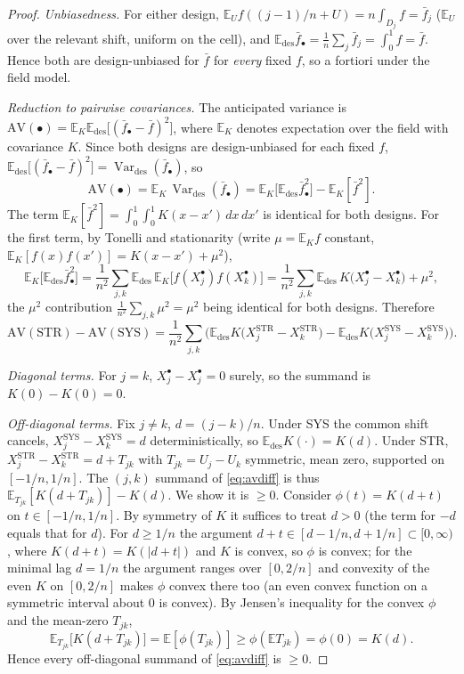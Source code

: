 \documentclass{amsart}
\theoremstyle{definition}
\newcommand{\E}{\mathbb{E}}
\newcommand{\Var}{\operatorname{Var}}
\begin{document}
\begin{proof}
\emph{Unbiasedness.} For either design, $\E_U f((j-1)/n+U)
=n\int_{D_j}f=\bar f_j$ ($\E_U$ over the relevant shift, uniform on the
cell), and $\E_{\mathrm{des}}\bar f_\bullet=\frac1n\sum_j\bar f_j
=\int_0^1 f=\bar f$. Hence both are design-unbiased for $\bar f$ for
\emph{every} fixed $f$, so a fortiori under the field model.

\emph{Reduction to pairwise covariances.} The anticipated variance is
$\mathrm{AV}(\bullet)=\E_K\E_{\mathrm{des}}\big[(\bar f_\bullet-\bar
f)^2\big]$, where $\E_K$ denotes expectation over the field with covariance
$K$. Since both designs are design-unbiased for each fixed $f$,
$\E_{\mathrm{des}}\big[(\bar f_\bullet-\bar f)^2\big]
=\Var_{\mathrm{des}}(\bar f_\bullet)$, so
\[
\mathrm{AV}(\bullet)
=\E_K\,\Var_{\mathrm{des}}(\bar f_\bullet)
=\E_K\Big[\E_{\mathrm{des}}\bar f_\bullet^2\Big]-\E_K[\bar f^2].
\]
The term $\E_K[\bar f^2]=\int_0^1\!\int_0^1 K(x-x')\,dx\,dx'$ is identical
for both designs. For the first term, by Tonelli and stationarity (write
$\mu=\E_K f$ constant, $\E_K[f(x)f(x')]=K(x-x')+\mu^2$),
\[
\E_K\big[\E_{\mathrm{des}}\bar f_\bullet^2\big]
=\frac1{n^2}\sum_{j,k}\E_{\mathrm{des}}\,
\E_K\big[f(X_j^\bullet)f(X_k^\bullet)\big]
=\frac1{n^2}\sum_{j,k}
\E_{\mathrm{des}}\,K\!\big(X_j^\bullet-X_k^\bullet\big)+\mu^2,
\]
the $\mu^2$ contribution $\frac1{n^2}\sum_{j,k}\mu^2=\mu^2$ being identical
for both designs. Therefore
\begin{equation}\label{eq:avdiff}
\mathrm{AV}(\mathrm{STR})-\mathrm{AV}(\mathrm{SYS})
=\frac1{n^2}\sum_{j,k}
\Big(\E_{\mathrm{des}}K\!\big(X_j^{\mathrm{STR}}-X_k^{\mathrm{STR}}\big)
-\E_{\mathrm{des}}K\!\big(X_j^{\mathrm{SYS}}-X_k^{\mathrm{SYS}}\big)\Big).
\end{equation}

\emph{Diagonal terms.} For $j=k$, $X_j^\bullet-X_j^\bullet=0$ surely, so
the summand is $K(0)-K(0)=0$.

\emph{Off-diagonal terms.} Fix $j\ne k$, $d=(j-k)/n$. Under SYS the common
shift cancels, $X_j^{\mathrm{SYS}}-X_k^{\mathrm{SYS}}=d$ deterministically,
so $\E_{\mathrm{des}}K(\cdot)=K(d)$. Under STR,
$X_j^{\mathrm{STR}}-X_k^{\mathrm{STR}}=d+T_{jk}$ with $T_{jk}=U_j-U_k$
symmetric, mean zero, supported on $[-1/n,1/n]$. The $(j,k)$ summand of
\eqref{eq:avdiff} is thus $\E_{T_{jk}}[K(d+T_{jk})]-K(d)$. We show it is
$\ge0$. Consider $\phi(t)=K(d+t)$ on $t\in[-1/n,1/n]$. By symmetry of $K$
it suffices to treat $d>0$ (the term for $-d$ equals that for $d$). For
$d\ge 1/n$ the argument $d+t\in[d-1/n,d+1/n]\subset[0,\infty)$, where
$K(d+t)=K(|d+t|)$ and $K$ is convex, so $\phi$ is convex; for the minimal
lag $d=1/n$ the argument ranges over $[0,2/n]$ and convexity of the even
$K$ on $[0,2/n]$ makes $\phi$ convex there too (an even convex function on
a symmetric interval about $0$ is convex). By Jensen's inequality for the
convex $\phi$ and the mean-zero $T_{jk}$,
\[
\E_{T_{jk}}\big[K(d+T_{jk})\big]=\E[\phi(T_{jk})]\ge
\phi(\E T_{jk})=\phi(0)=K(d).
\]
Hence every off-diagonal summand of \eqref{eq:avdiff} is $\ge0$.


\end{proof}
\end{document}
